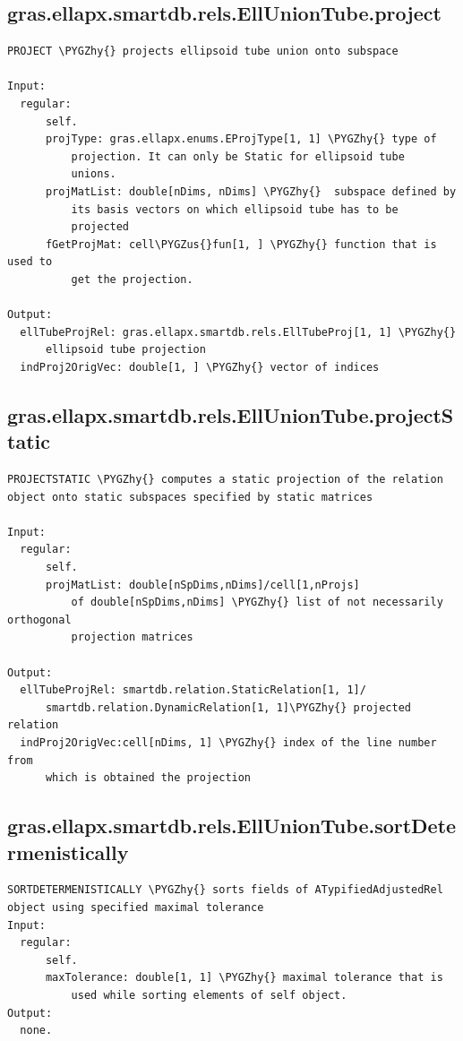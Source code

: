 \documentclass[letterpaper,10pt,english]{sphinxmanual}
\def\PYGZus{\char`\_}
\def\PYGZhy{\char`\-}
\begin{document}
\subsection{gras.ellapx.smartdb.rels.EllUnionTube.project}
\label{chap_functions:gras-ellapx-smartdb-rels-elluniontube-project}
\begin{Verbatim}[commandchars=\\\{\}]
PROJECT \PYGZhy{} projects ellipsoid tube union onto subspace

Input:
  regular:
      self.
      projType: gras.ellapx.enums.EProjType[1, 1] \PYGZhy{} type of
          projection. It can only be Static for ellipsoid tube
          unions.
      projMatList: double[nDims, nDims] \PYGZhy{}  subspace defined by
          its basis vectors on which ellipsoid tube has to be
          projected
      fGetProjMat: cell\PYGZus{}fun[1, ] \PYGZhy{} function that is used to
          get the projection.

Output:
  ellTubeProjRel: gras.ellapx.smartdb.rels.EllTubeProj[1, 1] \PYGZhy{}
      ellipsoid tube projection
  indProj2OrigVec: double[1, ] \PYGZhy{} vector of indices
\end{Verbatim}


\subsection{gras.ellapx.smartdb.rels.EllUnionTube.projectStatic}
\label{chap_functions:gras-ellapx-smartdb-rels-elluniontube-projectstatic}
\begin{Verbatim}[commandchars=\\\{\}]
PROJECTSTATIC \PYGZhy{} computes a static projection of the relation
object onto static subspaces specified by static matrices

Input:
  regular:
      self.
      projMatList: double[nSpDims,nDims]/cell[1,nProjs]
          of double[nSpDims,nDims] \PYGZhy{} list of not necessarily orthogonal
          projection matrices

Output:
  ellTubeProjRel: smartdb.relation.StaticRelation[1, 1]/
      smartdb.relation.DynamicRelation[1, 1]\PYGZhy{} projected relation
  indProj2OrigVec:cell[nDims, 1] \PYGZhy{} index of the line number from
      which is obtained the projection
\end{Verbatim}


\subsection{gras.ellapx.smartdb.rels.EllUnionTube.sortDetermenistically}
\label{chap_functions:gras-ellapx-smartdb-rels-elluniontube-sortdetermenistically}
\begin{Verbatim}[commandchars=\\\{\}]
SORTDETERMENISTICALLY \PYGZhy{} sorts fields of ATypifiedAdjustedRel
object using specified maximal tolerance
Input:
  regular:
      self.
      maxTolerance: double[1, 1] \PYGZhy{} maximal tolerance that is
          used while sorting elements of self object.
Output:
  none.
\end{Verbatim}
\end{document}
